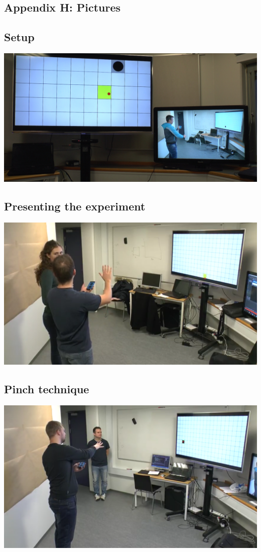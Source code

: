 \subsection{Appendix H: Pictures}

\subsection*{Setup}
\includegraphics[width=\textwidth]{appendix/images/setup.jpg}

\subsection*{Presenting the experiment}
\includegraphics[width=\textwidth]{appendix/images/alina_presenting.png}

\subsection*{Pinch technique}
\includegraphics[width=\textwidth]{appendix/images/alex_pinching.png}

